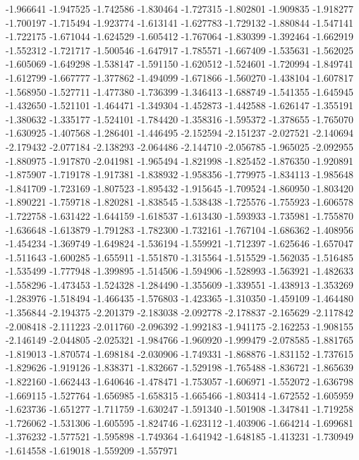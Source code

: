 -1.966641
-1.947525
-1.742586
-1.830464
-1.727315
-1.802801
-1.909835
-1.918277
-1.700197
-1.715494
-1.923774
-1.613141
-1.627783
-1.729132
-1.880844
-1.547141
-1.722175
-1.671044
-1.624529
-1.605412
-1.767064
-1.830399
-1.392464
-1.662919
-1.552312
-1.721717
-1.500546
-1.647917
-1.785571
-1.667409
-1.535631
-1.562025
-1.605069
-1.649298
-1.538147
-1.591150
-1.620512
-1.524601
-1.720994
-1.849741
-1.612799
-1.667777
-1.377862
-1.494099
-1.671866
-1.560270
-1.438104
-1.607817
-1.568950
-1.527711
-1.477380
-1.736399
-1.346413
-1.688749
-1.541355
-1.645945
-1.432650
-1.521101
-1.464471
-1.349304
-1.452873
-1.442588
-1.626147
-1.355191
-1.380632
-1.335177
-1.524101
-1.784420
-1.358316
-1.595372
-1.378655
-1.765070
-1.630925
-1.407568
-1.286401
-1.446495
-2.152594
-2.151237
-2.027521
-2.140694
-2.179432
-2.077184
-2.138293
-2.064486
-2.144710
-2.056785
-1.965025
-2.092955
-1.880975
-1.917870
-2.041981
-1.965494
-1.821998
-1.825452
-1.876350
-1.920891
-1.875907
-1.719178
-1.917381
-1.838932
-1.958356
-1.779975
-1.834113
-1.985648
-1.841709
-1.723169
-1.807523
-1.895432
-1.915645
-1.709524
-1.860950
-1.803420
-1.890221
-1.759718
-1.820281
-1.838545
-1.538438
-1.725576
-1.755923
-1.606578
-1.722758
-1.631422
-1.644159
-1.618537
-1.613430
-1.593933
-1.735981
-1.755870
-1.636648
-1.613879
-1.791283
-1.782300
-1.732161
-1.767104
-1.686362
-1.408956
-1.454234
-1.369749
-1.649824
-1.536194
-1.559921
-1.712397
-1.625646
-1.657047
-1.511643
-1.600285
-1.655911
-1.551870
-1.315564
-1.515529
-1.562035
-1.516485
-1.535499
-1.777948
-1.399895
-1.514506
-1.594906
-1.528993
-1.563921
-1.482633
-1.558296
-1.473453
-1.524328
-1.284490
-1.355609
-1.339551
-1.438913
-1.353269
-1.283976
-1.518494
-1.466435
-1.576803
-1.423365
-1.310350
-1.459109
-1.464480
-1.356844
-2.194375
-2.201379
-2.183038
-2.092778
-2.178837
-2.165629
-2.117842
-2.008418
-2.111223
-2.011760
-2.096392
-1.992183
-1.941175
-2.162253
-1.908155
-2.146149
-2.044805
-2.025321
-1.984766
-1.960920
-1.999479
-2.078585
-1.881765
-1.819013
-1.870574
-1.698184
-2.030906
-1.749331
-1.868876
-1.831152
-1.737615
-1.829626
-1.919126
-1.838371
-1.832667
-1.529198
-1.765488
-1.836721
-1.865639
-1.822160
-1.662443
-1.640646
-1.478471
-1.753057
-1.606971
-1.552072
-1.636798
-1.669115
-1.527764
-1.656985
-1.658315
-1.665466
-1.803414
-1.672552
-1.605959
-1.623736
-1.651277
-1.711759
-1.630247
-1.591340
-1.501908
-1.347841
-1.719258
-1.726062
-1.531306
-1.605595
-1.824746
-1.623112
-1.403906
-1.664214
-1.699681
-1.376232
-1.577521
-1.595898
-1.749364
-1.641942
-1.648185
-1.413231
-1.730949
-1.614558
-1.619018
-1.559209
-1.557971
